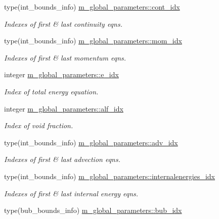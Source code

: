 \begin{DoxyCompactItemize}
type(int\+\_\+bounds\+\_\+info) \hyperlink{namespacem__global__parameters_a5d234ed722013d06fbb2d1ee5f8aab56}{m\+\_\+global\+\_\+parameters\+::cont\+\_\+idx}
\begin{DoxyCompactList}\small\item\em Indexes of first \& last continuity eqns. \end{DoxyCompactList}\item 
type(int\+\_\+bounds\+\_\+info) \hyperlink{namespacem__global__parameters_a293bc6a9ccf7a197d8a5f0cfc3988584}{m\+\_\+global\+\_\+parameters\+::mom\+\_\+idx}
\begin{DoxyCompactList}\small\item\em Indexes of first \& last momentum eqns. \end{DoxyCompactList}\item 
integer \hyperlink{namespacem__global__parameters_ac6ef72ca6aa7a22e60c864df25559892}{m\+\_\+global\+\_\+parameters\+::e\+\_\+idx}
\begin{DoxyCompactList}\small\item\em Index of total energy equation. \end{DoxyCompactList}\item 
integer \hyperlink{namespacem__global__parameters_af451fa7762c859ef20552498fa6edb16}{m\+\_\+global\+\_\+parameters\+::alf\+\_\+idx}
\begin{DoxyCompactList}\small\item\em Index of void fraction. \end{DoxyCompactList}\item 
type(int\+\_\+bounds\+\_\+info) \hyperlink{namespacem__global__parameters_ab73a1c5c3f6815695771323454db2a81}{m\+\_\+global\+\_\+parameters\+::adv\+\_\+idx}
\begin{DoxyCompactList}\small\item\em Indexes of first \& last advection eqns. \end{DoxyCompactList}\item 
type(int\+\_\+bounds\+\_\+info) \hyperlink{namespacem__global__parameters_a9eb3789b90381530338a223c99cf1090}{m\+\_\+global\+\_\+parameters\+::internalenergies\+\_\+idx}
\begin{DoxyCompactList}\small\item\em Indexes of first \& last internal energy eqns. \end{DoxyCompactList}\item 
type(bub\+\_\+bounds\+\_\+info) \hyperlink{namespacem__global__parameters_a9a425d1bd91d1765043adf8410b98bf7}{m\+\_\+global\+\_\+parameters\+::bub\+\_\+idx}

\end{DoxyCompactItemize}
